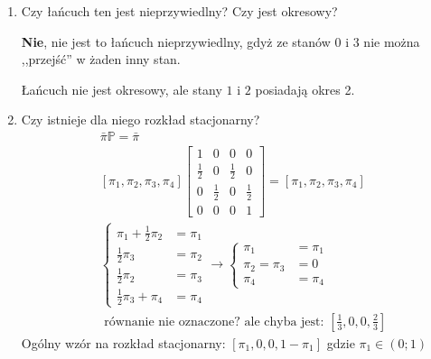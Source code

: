 \begin{enumerate}[label=\alph*)]
\item Czy łańcuch ten jest nieprzywiedlny? Czy jest okresowy?

\textbf{Nie}, nie jest to łańcuch nieprzywiedlny, gdyż ze stanów $0$ i $3$ nie można ,,przejść'' w żaden inny stan. 


Łańcuch nie jest okresowy, ale stany $1$ i $2$ posiadają okres 2.

\item Czy istnieje dla niego rozkład stacjonarny?
\begin{align*}
&\bar{\pi}\mathbb{P}=\bar{\pi}\\
&\left[\pi _1, \pi _2,\pi _3,\pi _4\right]\begin{bmatrix}
1&0&0&0\\
\frac{1}{2}&0&\frac{1}{2}&0\\
0&\frac{1}{2}&0&\frac{1}{2}\\
0&0&0&1
\end{bmatrix}=\left[\pi _1, \pi _2,\pi _3,\pi _4\right]\\
&\left\{\begin{matrix}
\pi _1 + \frac{1}{2} \pi _2 &= \pi _1\\
\frac{1}{2} \pi _3 &= \pi _2\\
\frac{1}{2} \pi _2 &= \pi _3\\
\frac{1}{2} \pi _3 + \pi _4 &= \pi _4
\end{matrix}\right. \rightarrow \left\{\begin{matrix}
\pi _1  &= \pi _1\\
\pi _2 = \pi _3 &= 0\\
\pi _4 &= \pi _4
\end{matrix}\right.\\
&\text{ równanie nie oznaczone? ale chyba jest: } \left[\frac{1}{3}, 0, 0, \frac{2}{3}\right]
\end{align*}
Ogólny wzór na rozkład stacjonarny: $\left[\pi _1, 0, 0, 1-\pi _1\right]$ gdzie $\pi _1 \in (0; 1)$
\end{enumerate}

